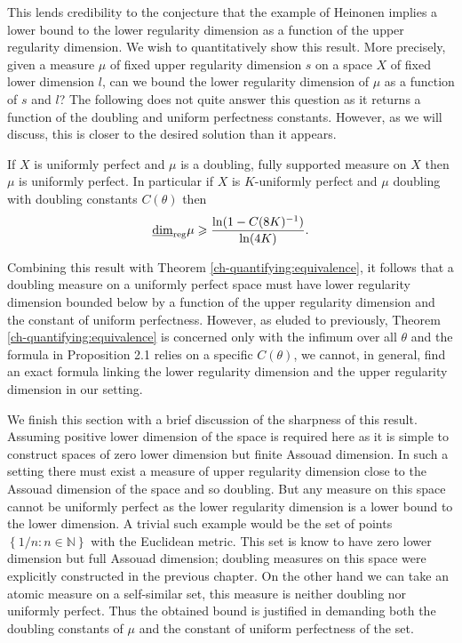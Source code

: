 This lends credibility to the conjecture that the example of Heinonen implies a lower bound to the lower regularity dimension as a function of the upper regularity dimension. We wish to quantitatively show this result. More precisely, given a measure $\mu$ of fixed upper regularity dimension $s$ on a space $X$ of fixed lower dimension $l$, can we bound the lower regularity dimension of $\mu$ as a function of $s$ and $l$? The following does not quite answer this question as it returns a function of the doubling and uniform perfectness constants. However, as we will discuss, this is closer to the desired solution than it appears.

\begin{proposition}\label{ch-quantifying:result-heinonen}
	If $X$ is uniformly perfect and $\mu$ is a doubling, fully supported measure on $X$ then $\mu$ is uniformly perfect. In particular if $X$ is $K$-uniformly perfect and $\mu$ doubling with doubling constants $C(\theta)$ then  
	$$\underline{\dim}_{\textup{reg}} \mu \geqslant \frac{\ln(1-C(8K)^{-1})}{\ln(4K)} .$$  
\end{proposition}


Combining this result with Theorem \ref{ch-quantifying:equivalence}, it follows that a doubling measure on a uniformly perfect space must have lower regularity dimension bounded below by a function of the upper regularity dimension and the constant of uniform perfectness. However, as eluded to previously, Theorem \ref{ch-quantifying:equivalence} is concerned only with the infimum over all $\theta$ and the formula in Proposition 2.1 relies on a specific $C(\theta)$, we cannot, in general, find an exact formula linking the lower regularity dimension and the upper regularity dimension in our setting.


We finish this section with a brief discussion of the sharpness of this result. Assuming positive lower dimension of the space is required here as it is simple to construct spaces of zero lower dimension but finite Assouad dimension. In such a setting there must exist a measure of upper regularity dimension close to the Assouad dimension of the space and so doubling. But any measure on this space cannot be uniformly perfect as the lower regularity dimension is a lower bound to the lower dimension. A trivial such example would be the set of points $\left\{ 1/n : n \in \mathbb{N} \right\}$ with the Euclidean metric. This set is know to have zero lower dimension but full Assouad dimension; doubling measures on this space were explicitly constructed in the previous chapter. On the other hand we can take an atomic measure on a self-similar set, this measure is neither doubling nor uniformly perfect. Thus the obtained bound is justified in demanding both the doubling constants of $\mu$ and the constant of uniform perfectness of the set.

